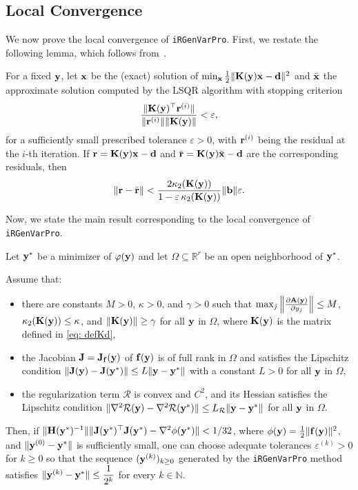 \documentclass[onefignum,onetabnum]{siamart171218}
\newcommand{\bA}{{\bf A}}
\newcommand{\bH}{{\bf H}}
\newcommand{\bJ}{{\bf J}}
\newcommand{\bK}{{\bf K}}
\newcommand{\bb}{{\bf b}}
\newcommand{\bd}{{\bf d}}
\newcommand{\bff}{{\bf f}}
\newcommand{\br}{{\bf r}}
\newcommand{\bx}{{\bf x}}
\newcommand{\by}{{\bf y}}
\newcommand{\calR}{\mathcal{R}}
\begin{document}
\subsection{Local Convergence} We now prove the local convergence of \texttt{iRGenVarPro}. First, we restate the following lemma, which follows from~\cite[Lemma 3.1]{espanol2025local}.

\begin{lemma}\label{lemma:approx_residual}
For a fixed $\by$, let $\bx$ be the (exact) solution of $\min_{\bx} \frac{1}{2}\|\bK(\by)\bx - \bd\|^2$ and $\bar \bx$ the approximate solution computed by the LSQR algorithm with stopping criterion
\begin{equation*}
\frac{\|\bK(\by)^\top \br^{(i)}\|}{\|\br^{(i)}\|\|\bK(\by)\|}<\varepsilon,
\end{equation*}
for a sufficiently small prescribed tolerance $\varepsilon>0$, with $\br^{(i)}$ being the residual at the $i$-th iteration. If $\br=\bK(\by)\bx- \bd$ and $ \bar \br = \bK(\by)\bar\bx-\bd$ are the corresponding residuals, then
\begin{equation*}
\|\br - \bar \br\| <   \frac{ 2 \kappa_2(\bK(\by))}{1-\varepsilon\, \kappa_2(\bK(\by))}\|\bb\|\varepsilon.
\end{equation*}
\end{lemma}

Now, we state the main result corresponding to the local convergence of \linebreak \texttt{iRGenVarPro}.
\begin{theorem}\label{thm: main} Let $\by^*$ be a minimizer of $\varphi(\by)$ and let $\Omega\subseteq \mathbb{R}^r$ be an open neighborhood  of $\by^*$. 

Assume that:
\begin{itemize}
\item there are constants $M>0$,  $\kappa>0$, and $\gamma >0$ such that $\max_j \left\|\frac{\partial \bA (\by)}{\partial y_j}\right\| \le M$, $\kappa_2(\bK(\by))\le \kappa$, and $\| \bK(\by)\| \ge \gamma$ for all $\by$ in $\Omega$, where $\bK(\by)$ is the matrix defined in \eqref{eq: defKd},
\item the Jacobian $\bJ= \bJ_{\bff}(\by)$ of $\bff(\by)$ is of full rank in $\Omega$ and satisfies the Lipschitz condition $\|\bJ(\by) - \bJ(\by^*) \|\le L \| \by - \by^\ast\|$ with a constant $L>0$ for all $\by$ in $\Omega$,
\item the regularization term $\calR$ is convex and $C^2$, and its Hessian satisfies the Lipschitz condition $\|\nabla^2 \mathcal{R}(\by) - \nabla^2 \mathcal{R}(\by^*) \|\le L_\mathcal{R} \| \by - \by^\ast\|$ for all $\by$ in $\Omega$.
\end{itemize}
Then, if $ \|\bH(\by^*)^{-1}\| \| \bJ(\by^*)^\top \bJ(\by^*) -\nabla^2\phi(\by^*)\| < 1/32$,  where $\phi(\by)=\frac{1}{2}\|\bff(\by)\|^2$, and $\|\by^{(0)}-\by^*\|$ is sufficiently small, one can choose adequate tolerances $\varepsilon^{(k)}>0$ for $k \ge 0$ so that the sequence $(\by^{(k)})_{k\ge 0}$ generated by the  \texttt{iRGenVarPro} method satisfies  $\|\by^{(k)}-\by^*\|\le \dfrac{1}{2^k}$ for every $k\in \mathbb{N}$.
\end{theorem}
\end{document}
